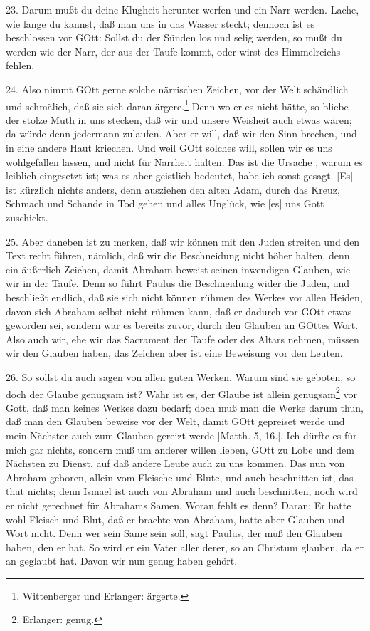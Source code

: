 23. Darum mußt du deine Klugheit herunter werfen und ein Narr werden. Lache, wie lange du kannst, daß man uns in das Wasser steckt; dennoch ist es beschlossen vor GOtt: Sollst du der Sünden los und selig werden, so mußt du werden wie der Narr, der aus der Taufe kommt, oder wirst des Himmelreichs fehlen.

24. Also nimmt GOtt gerne solche närrischen Zeichen, vor der Welt schändlich und schmälich, daß sie sich daran ärgere.\footnote{Wittenberger und Erlanger: ärgerte.} Denn wo er es nicht hätte, so bliebe der stolze Muth in uns stecken, daß wir und unsere Weisheit auch etwas wären; da würde denn jedermann zulaufen. Aber er will, daß wir den Sinn brechen, und in eine andere Haut kriechen. Und weil GOtt solches will, sollen wir es uns wohlgefallen lassen, und nicht für Narrheit halten. Das ist die Ursache
, warum es leiblich eingesetzt ist; was es aber geistlich bedeutet, habe ich sonst gesagt. [Es] ist kürzlich nichts anders, denn ausziehen den alten Adam, durch das Kreuz, Schmach und Schande in Tod gehen und alles Unglück, wie [es] uns Gott zuschickt.

25. Aber daneben ist zu merken, daß wir können mit den Juden streiten und den Text recht führen, nämlich, daß wir die Beschneidung nicht höher halten, denn ein äußerlich Zeichen, damit Abraham beweist seinen inwendigen Glauben, wie wir in der Taufe. Denn so führt Paulus die Beschneidung wider die Juden, und beschließt endlich, daß sie sich nicht können rühmen des Werkes vor allen Heiden, davon sich Abraham selbst nicht rühmen kann, daß er dadurch vor GOtt etwas geworden sei, sondern war es bereits zuvor, durch den Glauben an GOttes Wort. Also auch wir, ehe wir das Sacrament der Taufe oder des Altars nehmen, müssen wir den Glauben haben, das Zeichen aber ist eine Beweisung vor den Leuten.

26. So sollst du auch sagen von allen guten Werken. Warum sind sie geboten, so doch der Glaube genugsam ist? Wahr ist es, der Glaube ist allein genugsam\footnote{Erlanger: genug.} vor Gott, daß man keines Werkes dazu bedarf; doch muß man die Werke darum thun, daß man den Glauben beweise vor der Welt, damit GOtt gepreiset werde und mein Nächster auch zum Glauben gereizt werde [Matth. 5, 16.]. Ich dürfte es für mich gar nichts, sondern muß um anderer willen lieben, GOtt zu Lobe und dem Nächsten zu Dienst, auf daß andere Leute auch zu uns kommen. Das nun von Abraham geboren, allein vom Fleische und Blute, und auch beschnitten ist, das thut nichts; denn Ismael ist auch von Abraham und auch beschnitten, noch wird er nicht gerechnet für Abrahams Samen. Woran fehlt es denn? Daran: Er hatte wohl Fleisch und Blut, daß er brachte von Abraham, hatte aber Glauben und Wort nicht. Denn wer sein Same sein soll, sagt Paulus, der muß den Glauben haben, den er hat. So wird er ein Vater aller derer, so an Christum glauben, da er an geglaubt hat. Davon wir nun genug haben gehört.

